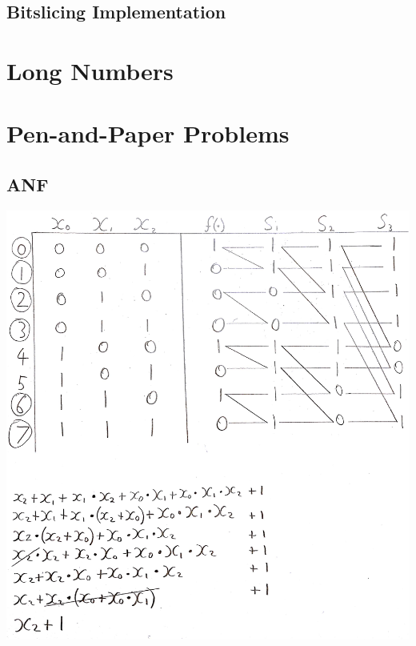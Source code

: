 \documentclass[11pt, a4paper]{article}
\begin{document}

\subsection{Bitslicing Implementation}\label{subsec:bitslicingImplementation}





\section{Long Numbers}\label{sec:longnumbers}

\section{Pen-and-Paper Problems}\label{sec:penandpaperproblems}

\subsection{ANF}\label{subsec:anf}
\includegraphics[width=\textwidth]{anf}
\end{document}
